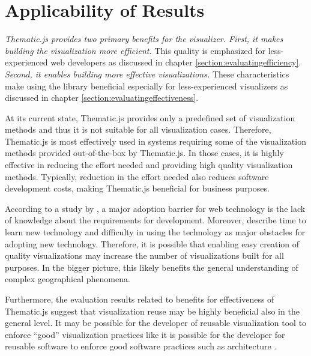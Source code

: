 \section{Applicability of Results}

\emph{Thematic.js provides two primary benefits for the visualizer. First, it makes building the visualization more efficient.} This quality is emphasized for less-experienced web developers as discussed in chapter \ref{section:evaluatingefficiency}. \emph{Second, it enables building more effective visualizations.} These characteristics make using the library beneficial especially for less-experienced visualizers as discussed in chapter \ref{section:evaluatingeffectiveness}.

At its current state, Thematic.js provides only a predefined set of visualization methods and thus it is not suitable for all visualization cases. Therefore, Thematic.js is most effectively used in systems requiring some of the visualization methods provided out-of-the-box by Thematic.js. In those cases, it is highly effective in reducing the effort needed and providing high quality visualization methods. Typically, reduction in the effort needed also reduces software development costs, making Thematic.js beneficial for business purposes. 

According to a study by \citet{nambisan_technical_1999}, a major adoption barrier for web technology is the lack of knowledge about the requirements for development. Moreover, \citet{butler_barriers_2002} describe time to learn new technology and difficulty in using the technology as major obstacles for adopting new technology. Therefore, it is possible that enabling easy creation of quality visualizations may increase the number of visualizations built for all purposes. In the bigger picture, this likely benefits the general understanding of complex geographical phenomena.

Furthermore, the evaluation results related to benefits for effectiveness of Thematic.js suggest that visualization reuse may be highly beneficial also in the general level. It may be possible for the developer of reusable visualization tool to enforce ``good'' visualization practices like it is possible for the developer for reusable software to enforce good software practices such as architecture \citep{mohagheghi_quality_2007}.


